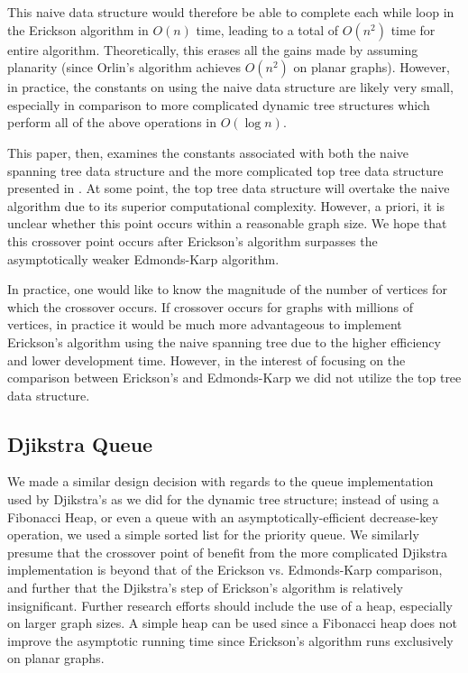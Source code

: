 \documentclass[12pt]{article}
\begin{document}
This naive data structure would therefore be able to complete each while loop in the Erickson algorithm in $O(n)$ time, leading to a total of $O(n^2)$ time for entire algorithm. Theoretically, this erases all the gains made by assuming planarity (since Orlin's algorithm achieves $O(n^2)$ on planar graphs). However, in practice, the constants on using the naive data structure are likely very small, especially in comparison to more complicated dynamic tree structures which perform all of the above operations in $O(\log n)$. 

This paper, then, examines the constants associated with both the naive spanning tree data structure and the more complicated top tree data structure presented in \cite{tarjanwerneck2005}. At some point, the top tree data structure will overtake the naive algorithm due to its superior computational complexity. However, a priori, it is unclear whether this point occurs within a reasonable graph size.  We hope that this crossover point occurs after Erickson's algorithm surpasses the asymptotically weaker Edmonds-Karp algorithm.

In practice, one would like to know the magnitude of the number of vertices for which the crossover occurs. If crossover occurs for graphs with millions of vertices, in practice it would be much more advantageous to implement Erickson's algorithm using the naive spanning tree due to the higher efficiency and lower development time.  However, in the interest of focusing on the comparison between Erickson's and Edmonds-Karp we did not utilize the top tree data structure.

\subsection{Djikstra Queue}

We made a similar design decision with regards to the queue implementation used by Djikstra's as we did for the dynamic tree structure; instead of using a Fibonacci Heap, or even a queue with an asymptotically-efficient decrease-key operation, we used a simple sorted list for the priority queue.  We similarly presume that the crossover point of benefit from the more complicated Djikstra implementation is beyond that of the Erickson vs. Edmonds-Karp comparison, and further that the Djikstra's step of Erickson's algorithm is relatively insignificant.  Further research efforts should include the use of a heap, especially on larger graph sizes.  A simple heap can be used since a Fibonacci heap does not improve the asymptotic running time since Erickson's algorithm runs exclusively on planar graphs.
\end{document}
